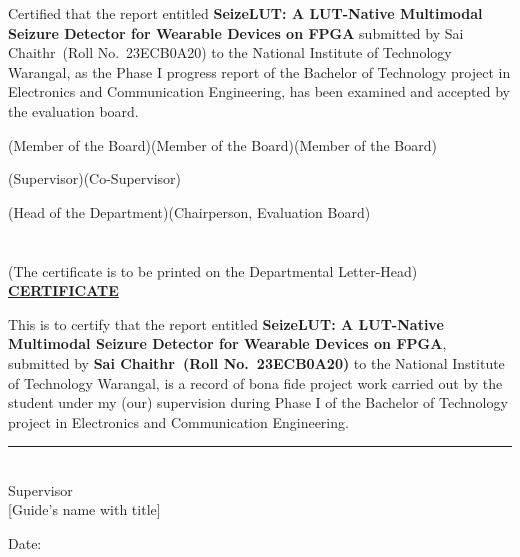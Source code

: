 \documentclass[12pt,a4paper,oneside]{report}
\newcommand{\projtitleshort}{SeizeLUT: A LUT-Native Multimodal Seizure Detector for Wearable Devices on FPGA}
\newcommand{\studentA}{Sai Chaithr}
\newcommand{\rollA}{23ECB0A20}
\newcommand{\guide}{[Guide's name with title]}
\newcommand{\dept}{Electronics and Communication Engineering}
\begin{document}
\vspace{8mm}
Certified that the report entitled \textbf{\projtitleshort} submitted by \studentA\ (Roll No.\ \rollA)
to the National Institute of Technology Warangal, as the Phase I progress report of the Bachelor of Technology
project in \dept, has been examined
and accepted by the evaluation board.

\vspace{30mm}
\noindent(Member of the Board)\hfill(Member of the Board)\hfill(Member of the Board)

\vspace{30mm}
\noindent(Supervisor)\hfill(Co-Supervisor)

\vspace{30mm}
\noindent(Head of the Department)\hfill(Chairperson, Evaluation Board)

\chapter*{}
\thispagestyle{plain}
\vspace{-30mm}
\begin{center}
(The certificate is to be printed on the Departmental Letter-Head)\\[14mm]
{\large\bfseries\underline{CERTIFICATE}}
\end{center}
\vspace{8mm}
This is to certify that the report entitled \textbf{\projtitleshort}, submitted by \textbf{\studentA\ (Roll No.\
\rollA)} to the National Institute of Technology Warangal, is a record of bona fide project work carried out by
the student under my (our) supervision during Phase I of the Bachelor of Technology project in \dept.

\vspace{40mm}
\noindent\rule{60mm}{0.4pt}\\
\hspace*{14mm}Supervisor\\
\hspace*{4mm}\guide

\vspace{15mm}
\noindent Date:

\end{document}
